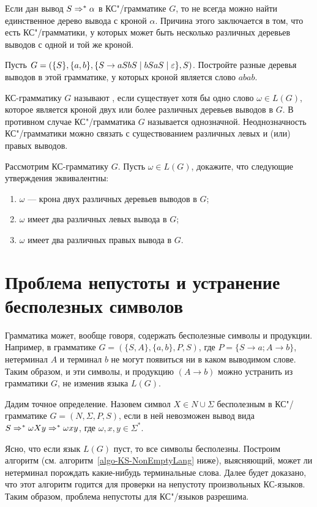 Если дан вывод $S\Rightarrow^*\alpha$ в КС"/грамматике $G$, то не всегда можно найти единственное дерево вывода с кроной $\alpha$. Причина этого заключается в том, что есть КС"/грамматики, у которых может быть несколько различных деревьев выводов с одной и той же кроной.

\begin{myproblem}
Пусть $G=(\{S\},\{a,b\},\{S\to aSbS\mid bSaS\mid\varepsilon\},S)$. Постройте разные деревья выводов в этой грамматике, у которых кроной является слово $abab$.
\end{myproblem}

КС-грамматику $G$ называют , если существует хотя бы одно слово $\omega\in L(G)$, которое является кроной двух или более различных деревьев выводов в $G$. В противном случае КС"/грамматика $G$ называется однозначной. Неоднозначность КС"/грамматики можно связать с существованием различных левых и (или) правых выводов.

\begin{myproblem}
Рассмотрим КС-грамматику $G$. Пусть $\omega\in L(G)$, докажите, что следующие утверждения эквивалентны:
\begin{enumerate}
\item $\omega$ --- крона двух различных деревьев выводов в $G$;
\item $\omega$ имеет два различных левых вывода в $G$;
\item $\omega$ имеет два различных правых вывода в $G$.
\end{enumerate}
\end{myproblem}

\section{Проблема непустоты и устранение бесполезных символов}
\label{Chapter6-problemEmptyLang}

Грамматика может, вообще говоря, содержать бесполезные символы и продукции. Например, в грамматике $G=(\{S,A\},\{a,b\},P,S)$, где $P=\{S\to a;A\to b\}$, нетерминал $A$ и терминал $b$ не могут появиться ни в каком выводимом слове. Таким образом, и эти символы, и продукцию $(A\to b)$ можно устранить из грамматики $G$, не изменив языка $L(G)$.

Дадим точное определение. Назовем символ $X\in N\cup\Sigma$ бесполезным в КС"/грамматике $G=(N,\Sigma,P,S)$, если в ней невозможен вывод вида $S\Rightarrow^*\omega Xy\Rightarrow^*\omega xy$, где $\omega,x,y\in\Sigma^*$.

Ясно, что если язык $L(G)$ пуст, то все символы бесполезны. Построим алгоритм (см. алгоритм~\ref{algo-KS-NonEmptyLang} ниже), выясняющий, может ли нетерминал порождать какие-нибудь терминальные слова. Далее будет доказано, что этот алгоритм годится для проверки на непустоту произвольных КС-языков. Таким образом, проблема непустоты для КС"/языков разрешима.


